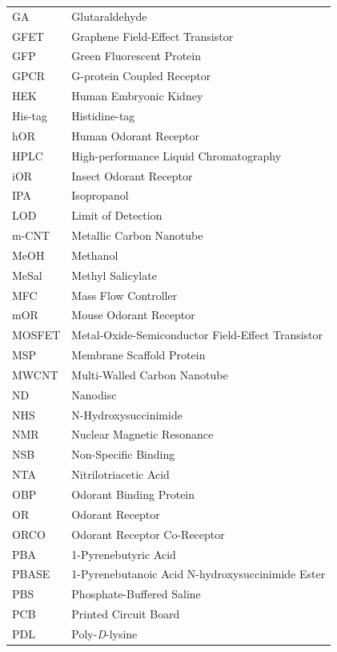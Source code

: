 \documentclass[
  a4paper,
]{scrbook}
\begin{document}
\begin{table}[H]
  \begin{tabular}{@{}p{} p{}@{}}  %
    GA  & Glutaraldehyde  \\[5pt]
    GFET  & Graphene Field-Effect Transistor  \\[5pt]
    GFP  & Green Fluorescent Protein  \\[5pt]
    GPCR  & G-protein Coupled Receptor  \\[5pt]
    HEK  & Human Embryonic Kidney  \\[5pt]
    His-tag  & Histidine-tag  \\[5pt]
    hOR  & Human Odorant Receptor  \\[5pt]
    HPLC  & High-performance Liquid Chromatography   \\[5pt]
    iOR  & Insect Odorant Receptor  \\[5pt]
    IPA  & Isopropanol  \\[5pt]
    LOD  & Limit of Detection  \\[5pt]
    m-CNT  & Metallic Carbon Nanotube   \\[5pt]
    MeOH  & Methanol   \\[5pt]
    MeSal  & Methyl Salicylate   \\[5pt]
    MFC  & Mass Flow Controller   \\[5pt]
    mOR  & Mouse Odorant Receptor  \\[5pt]
    MOSFET  & Metal-Oxide-Semiconductor Field-Effect Transistor  \\[5pt]
    MSP  & Membrane Scaffold Protein  \\[5pt]
    MWCNT  & Multi-Walled Carbon Nanotube  \\[5pt]
    ND  & Nanodisc  \\[5pt]
    NHS  & N-Hydroxysuccinimide  \\[5pt]
    NMR  & Nuclear Magnetic Resonance  \\[5pt]
    NSB  & Non-Specific Binding   \\[5pt]
    NTA  & Nitrilotriacetic Acid   \\[5pt]
    OBP  & Odorant Binding Protein  \\[5pt]
    OR  & Odorant Receptor  \\[5pt]
    ORCO  & Odorant Receptor Co-Receptor  \\[5pt]
    PBA  & 1-Pyrenebutyric Acid  \\[5pt]
    PBASE  & 1-Pyrenebutanoic Acid N-hydroxysuccinimide Ester  \\[5pt]
    PBS  & Phosphate-Buffered Saline  \\[5pt]
    PCB  & Printed Circuit Board   \\[5pt]
    PDL & Poly-\textit{D}-lysine  \\[5pt]
  \end{tabular}
\end{table}
\end{document}
